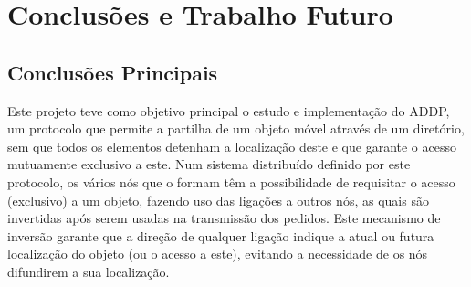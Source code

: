 \chapter{Conclusões e Trabalho Futuro}
\label{chap:conc-trab-futuro}

\section{Conclusões Principais}
\label{sec:conc-princ}

\begin{comment}
    Lições aprendidas
    - Implementaçã de um sistema concorrente e distribuído
    - Evitar race conditions
    - Oportunidade de usar Mecanismos de Sincronização e Concorrência

    Pontos Principais
    - o que é que foi possível fazer
    - o que é em geral este trabalho/implementação
    - possível implementação moderna com visualização do algoritmo 

    Neste trabalho foi possível estudar e implementar o sistema concorrente e distribuído, que faz uso do ``Arrow Distributed Directory Protocol''.
    O que torna notável este protocolo é o mecanismo de inversão ou troca de ligações, que mesmo sendo simples,
    evita que mais que um elemento no sistema tenha acesso a um objeto que pretendemos ter o acesso exclusivo, isto é, evita falhas de Condições de Corrida.
    Este tipo de falhas pode ter grande impacto no bom funcionamento de programas concorrentes, pois a leitura e/ou escrita concorrente de 
    informação pode levar a resultados imprevisíveis. 

    Após um estudo do o artigo que introduz o \acs{ADDP} \cite{Arrow}, que permitiu a realização de uma especificação dos elementos que pertencem ao sistema definido por o protocolo estudado,
    esta que foi usada como base no planeamento e implementação do projeto.
    No desenvolvimento do programa executado no sistema distribuído, foi possível praticar o uso de mecanismos de sincronização e concorrentes, estes oferecidos pela Linguagem \emph{Go},
    a linguagem escolhida para a implementação.
    Para além da implementação do programa distribuído, foi desenvolvida uma interface, que permitiu visualizar o protocolo em ação, testar a implementação, e provar (parcialmente) o seu
    bom funcionamento e fidelidade com o descrito na Especificação.
\end{comment}


Este projeto teve como objetivo principal o estudo e implementação do \acs{ADDP}, um protocolo que permite a partilha de um objeto móvel através de um diretório, 
sem que todos os elementos detenham a localização deste
e que garante o acesso mutuamente exclusivo a este. 
Num sistema distribuído definido por este protocolo, os vários nós que o formam têm a possibilidade de requisitar o acesso (exclusivo) a um objeto,
fazendo uso das ligações a outros nós, as quais são invertidas após serem usadas na transmissão dos pedidos. Este mecanismo de inversão garante que a direção de qualquer
ligação indique a atual ou futura localização do objeto (ou o acesso a este), evitando a necessidade de os nós difundirem a sua localização.


